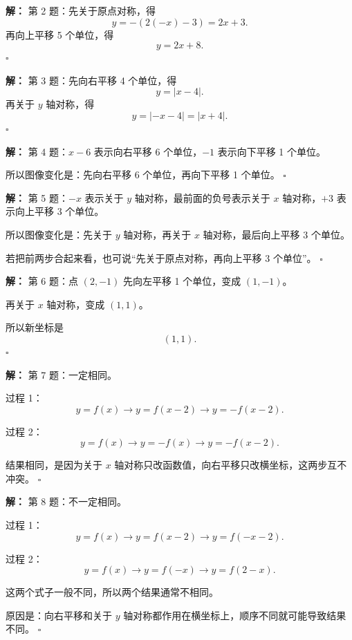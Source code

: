 \documentclass[11pt,a4paper,fontset=fandol]{ctexart}
\theoremstyle{formaltheorem}
\theoremstyle{formalexample}
\newenvironment{solution}{\par\noindent\textbf{解：}}{\hfill$\square$\par}
\begin{document}
\begin{solution}
第 2 题：先关于原点对称，得
\[
y=-(2(-x)-3)=2x+3.
\]
再向上平移 5 个单位，得
\[
y=2x+8.
\]
\end{solution}

\begin{solution}
第 3 题：先向右平移 4 个单位，得
\[
y=|x-4|.
\]
再关于 \(y\) 轴对称，得
\[
y=|-x-4|=|x+4|.
\]
\end{solution}

\begin{solution}
第 4 题：\(x-6\) 表示向右平移 6 个单位，\(-1\) 表示向下平移 1 个单位。

所以图像变化是：先向右平移 6 个单位，再向下平移 1 个单位。
\end{solution}

\begin{solution}
第 5 题：\(-x\) 表示关于 \(y\) 轴对称，最前面的负号表示关于 \(x\) 轴对称，\(+3\) 表示向上平移 3 个单位。

所以图像变化是：先关于 \(y\) 轴对称，再关于 \(x\) 轴对称，最后向上平移 3 个单位。

若把前两步合起来看，也可说“先关于原点对称，再向上平移 3 个单位”。
\end{solution}

\begin{solution}
第 6 题：点 \((2,-1)\) 先向左平移 1 个单位，变成 \((1,-1)\)。

再关于 \(x\) 轴对称，变成 \((1,1)\)。

所以新坐标是
\[
(1,1).
\]
\end{solution}

\begin{solution}
第 7 题：一定相同。

过程 1：
\[
y=f(x) \rightarrow y=f(x-2) \rightarrow y=-f(x-2).
\]

过程 2：
\[
y=f(x) \rightarrow y=-f(x) \rightarrow y=-f(x-2).
\]

结果相同，是因为关于 \(x\) 轴对称只改函数值，向右平移只改横坐标，这两步互不冲突。
\end{solution}

\begin{solution}
第 8 题：不一定相同。

过程 1：
\[
y=f(x) \rightarrow y=f(x-2) \rightarrow y=f(-x-2).
\]

过程 2：
\[
y=f(x) \rightarrow y=f(-x) \rightarrow y=f(2-x).
\]

这两个式子一般不同，所以两个结果通常不相同。

原因是：向右平移和关于 \(y\) 轴对称都作用在横坐标上，顺序不同就可能导致结果不同。
\end{solution}
\end{document}

